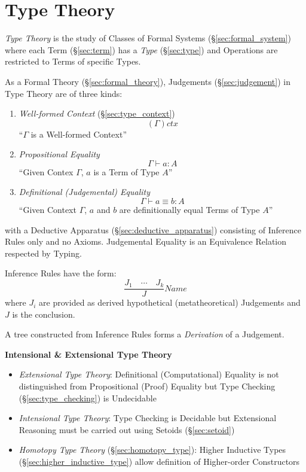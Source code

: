\part{Type Theory}\label{sec:type_theory}

\emph{Type Theory} is the study of Classes of Formal Systems
(\S\ref{sec:formal_system}) where each Term (\S\ref{sec:term}) has a
\emph{Type} (\S\ref{sec:type}) and Operations are restricted to Terms
of specific Types.

As a Formal Theory (\S\ref{sec:formal_theory}), Judgements
(\S\ref{sec:judgement}) in Type Theory are of three
kinds\cite{hott13}:
\begin{enumerate}

\item \emph{Well-formed Context} (\S\ref{sec:type_context})
\[
  (\Gamma) ctx
\]
``$\Gamma$ is a Well-formed Context''

\item \emph{Propositional Equality}
\[
  \Gamma \vdash a : A
\]
``Given Contex $\Gamma$, $a$ is a Term of Type $A$''

\item \emph{Definitional (Judgemental) Equality}
\[
  \Gamma \vdash a \equiv b : A
\]
``Given Context $\Gamma$, $a$ and $b$ are definitionally equal Terms
of Type $A$''

\end{enumerate}
with a Deductive Apparatus (\S\ref{sec:deductive_apparatus})
consisting of Inference Rules only and no Axioms. Judgemental Equality
is an Equivalence Relation respected by Typing.

Inference Rules have the form:
\[
  \frac{J_1 \quad \cdots \quad J_k} {J} Name
\]
where $J_i$ are provided as derived hypothetical (metatheoretical)
Judgements and $J$ is the conclusion.

A tree constructed from Inference Rules forms a \emph{Derivation} of a
Judgement.

\textbf{Intensional \& Extensional Type Theory}

\begin{itemize}
\item \emph{Extensional Type Theory}: Definitional (Computational)
  Equality is not distinguished from Propositional (Proof) Equality
  but Type Checking (\S\ref{sec:type_checking}) is Undecidable
\item \emph{Intensional Type Theory}: Type Checking is Decidable but
  Extensional Reasoning must be carried out using Setoids
  (\S\ref{sec:setoid})
\item \emph{Homotopy Type Theory} (\S\ref{sec:homotopy_type}): Higher
  Inductive Types (\S\ref{sec:higher_inductive_type}) allow definition
  of Higher-order Constructors
\end{itemize}

